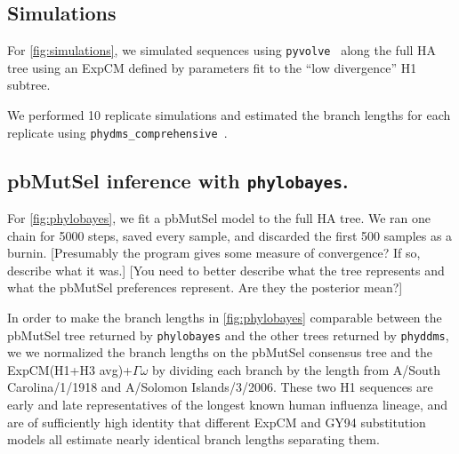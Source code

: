 \documentclass[11pt]{article}
\newcommand\jdbcomment[1]{{\color{red}[#1]}}
\begin{document}
\subsection*{Simulations}
For \ref{fig:simulations}, we simulated sequences using \texttt{pyvolve}~\citep{spielman2015pyvolve} along the full HA tree using an ExpCM defined by parameters fit to the ``low divergence'' H1 subtree. 

We performed 10 replicate simulations and estimated the branch lengths for each replicate using \texttt{phydms\_comprehensive}~\citep{hilton2017phydms}. 

\subsection*{pbMutSel inference with \texttt{phylobayes}.}
For \ref{fig:phylobayes}, we fit a pbMutSel model to the full HA tree. 
We ran one chain for 5000 steps, saved every sample, and discarded the first 500 samples as a burnin. 
\jdbcomment{Presumably the program gives some measure of convergence? If so, describe what it was.}
\jdbcomment{You need to better describe what the tree represents and what the pbMutSel preferences represent. Are they the posterior mean?}

In order to make the branch lengths in \ref{fig:phylobayes} comparable between the pbMutSel tree returned by \texttt{phylobayes} and the other trees returned by \texttt{phyddms}, we we normalized the branch lengths on the pbMutSel consensus tree and the ExpCM(H1+H3 avg)+$\Gamma\omega$ by dividing each branch by the length from A/South Carolina/1/1918 and A/Solomon Islands/3/2006. 
These two H1 sequences are early and late representatives of the longest known human influenza lineage, and are of sufficiently high identity that different ExpCM and GY94 substitution models all estimate nearly identical branch lengths separating them. 
\end{document}
